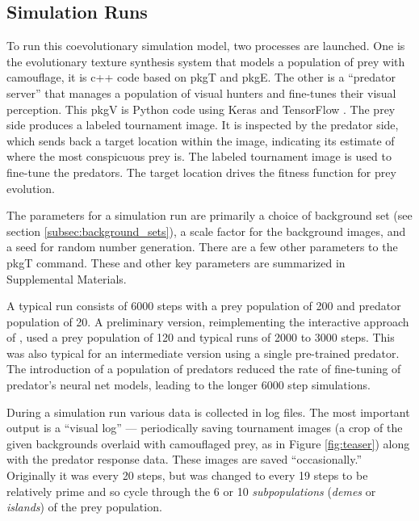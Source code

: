 \documentclass[acmtog]{acmart}
\newcommand{\jargon}[1]{\textit{#1}}
\newcommand{\texsyn}[0]{pkgT}
\newcommand{\lazypredator}[0]{pkgE}
\newcommand{\predatoreye}[0]{pkgV}
\begin{document}
\par


\subsection{Simulation Runs}
To run this coevolutionary simulation model, two processes are launched. One is the evolutionary texture synthesis system that models a population of prey with camouflage, it is c++ code based on \texsyn{} and \lazypredator{}. The other is a “predator server” that manages a population of visual hunters and fine-tunes their visual perception. This \predatoreye{} is Python code using Keras \cite{chollet_keras_2015} and TensorFlow \cite{tensorflow_whitepaper_2015}. The prey side produces a labeled tournament image. It is inspected by the predator side, which sends back a target location within the image, indicating its estimate of where the most conspicuous prey is. The labeled tournament image is used to fine-tune the predators. The target location drives the fitness function for prey evolution.
\par
The parameters for a simulation run are primarily a choice of background set (see section \ref{subsec:background_sets}), a scale factor for the background images, and a seed for random number generation. There are a few other parameters to the \texsyn{} command. These and other key parameters are summarized in Supplemental Materials.
\par
A typical run consists of 6000 steps with a prey population of 200 and predator population of 20. A preliminary version, reimplementing the interactive approach of \citet{reynolds_iec_2011}, used a prey population of 120 and typical runs of 2000 to 3000 steps. This was also typical for an intermediate version using a single pre-trained predator. The introduction of a population of predators reduced the rate of fine-tuning of predator's neural net models, leading to the longer 6000 step simulations.
\par
During a simulation run various data is collected in log files. The most important output is a “visual log” — periodically saving tournament images (a crop of the given backgrounds overlaid with camouflaged prey, as in Figure \ref{fig:teaser}) along with the predator response data. These images are saved “occasionally.” Originally it was every 20 steps, but was changed to every 19 steps to be relatively prime and so cycle through the 6 or 10 \jargon{subpopulations} (\jargon{demes} or \jargon{islands}) of the prey population.
\par
\end{document}
